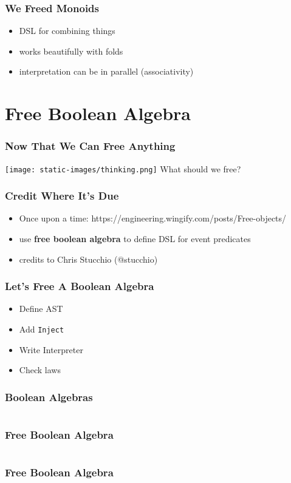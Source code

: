 \documentclass{beamer}
\newcommand{\recipe}{%
  \begin{itemize}
  \item Define AST
  \item Add \texttt{Inject}
  \item Write Interpreter
  \item Check laws
  \end{itemize}
}
\begin{document}
\begin{frame}
  \frametitle{We Freed Monoids}
  \begin{itemize}
  \item DSL for combining things
  \item works beautifully with folds
  \item interpretation can be in parallel (associativity)
  \end{itemize}
\end{frame}

\section{Free Boolean Algebra}\label{sec:free-boolean-algebra}

\begin{frame}
  \frametitle{Now That We Can Free Anything}
  \begin{center}
    \texttt{[image: static-images/thinking.png]}
    \vfill
    {\Huge What should we free?}
  \end{center}
\end{frame}

\begin{frame}
  \frametitle{Credit Where It's Due}
  \begin{itemize}
  \item Once upon a time:
    https://engineering.wingify.com/posts/Free-objects/
  \item use \textbf{free boolean algebra} to define DSL for event
    predicates
  \item credits to Chris Stucchio (@stucchio)
  \end{itemize}
\end{frame}

\begin{frame}
  \frametitle{Let's Free A Boolean Algebra}
  \recipe{}
\end{frame}

\begin{frame}
  \frametitle{Boolean Algebras}
  \inputminted{scala}{snippets/boolean-algebra.scala}
\end{frame}

\begin{frame}
  \frametitle{Free Boolean Algebra}
  \inputminted{scala}{snippets/free-bool.scala}
\end{frame}

\begin{frame}
  \frametitle{Free Boolean Algebra}
\end{frame}
\end{document}
